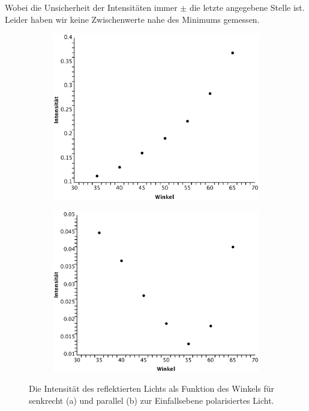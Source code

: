\documentclass[twoside]{article}
\begin{document}
Wobei die Unsicherheit der Intensitäten immer $\pm$ die letzte angegebene Stelle ist. Leider haben wir keine Zwischenwerte nahe des Minimums gemessen.

\begin{center}
\begin{figure}[H]
\begin{subfigure}{0.52\textwidth}
\includegraphics[width=0.9\linewidth]{reflexion_senkrecht.eps}
\caption{}
\end{subfigure}
\begin{subfigure}{0.52\textwidth}
\includegraphics[width=0.9\linewidth]{reflexion_parallel.eps}
\caption{}
\end{subfigure}
\caption{Die Intensität des reflektierten Lichts als Funktion des Winkels für senkrecht (a) und parallel (b) zur Einfallsebene polarisiertes Licht.}
\end{figure}
\label{fig:brewster}
\end{center}
\end{document}
